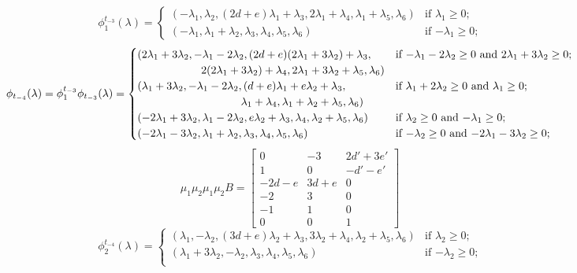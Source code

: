 \documentclass{amsart}
\numberwithin{theorem}{section}
\begin{document}
  \[
    \phi^{t_{-3}}_1(\lambda)
    =
    \begin{cases} 
      (-\lambda_1,\lambda_2,(2d+e)\lambda_1+\lambda_3,2\lambda_1+\lambda_4,\lambda_1+\lambda_5,\lambda_6) & \text{if $\lambda_1 \ge 0$;}\\
      (-\lambda_1,\lambda_1+\lambda_2,\lambda_3,\lambda_4,\lambda_5,\lambda_6) & \text{if $-\lambda_1 \ge 0$;}
    \end{cases}
  \]
  \[
    \phi_{t_{-4}}(\lambda)=\phi^{t_{-3}}_1\phi_{t_{-3}}(\lambda)
    =
    \begin{cases}
      (2\lambda_1+3\lambda_2,-\lambda_1-2\lambda_2,(2d+e)(2\lambda_1+3\lambda_2)+\lambda_3, & \text{if $-\lambda_1-2\lambda_2 \ge 0$ and $2\lambda_1+3\lambda_2 \ge 0$;}\\
      \hspace{0.8in} 2(2\lambda_1+3\lambda_2)+\lambda_4,2\lambda_1+3\lambda_2+\lambda_5,\lambda_6) & \\
      (\lambda_1+3\lambda_2,-\lambda_1-2\lambda_2,(d+e)\lambda_1+e\lambda_2+\lambda_3, & \text{if $\lambda_1+2\lambda_2 \ge 0$ and $\lambda_1 \ge 0$;}\\
      \hspace{1.3in} \lambda_1+\lambda_4,\lambda_1+\lambda_2+\lambda_5,\lambda_6) & \\
      (-2\lambda_1+3\lambda_2,\lambda_1-2\lambda_2,e\lambda_2+\lambda_3,\lambda_4,\lambda_2+\lambda_5,\lambda_6) & \text{if $\lambda_2 \ge 0$ and $-\lambda_1 \ge 0$;}\\
      (-2\lambda_1-3\lambda_2,\lambda_1+\lambda_2,\lambda_3,\lambda_4,\lambda_5,\lambda_6) & \text{if $-\lambda_2 \ge 0$ and $-2\lambda_1-3\lambda_2 \ge 0$;}\\
    \end{cases}
  \]
  \[
    \mu_1\mu_2\mu_1\mu_2 B=\left[\begin{array}{ccc} 
    0 & -3 & 2d'+3e' \\ 
    1 & 0 & -d'-e'\\ 
    -2d-e & 3d+e & 0\\ 
    -2 & 3 & 0\\ 
    -1 & 1 & 0\\ 
    0 & 0 & 1
    \end{array}\right]
  \]
  \[
    \phi^{t_{-4}}_2(\lambda)
    =
    \begin{cases} 
      (\lambda_1,-\lambda_2,(3d+e)\lambda_2+\lambda_3,3\lambda_2+\lambda_4,\lambda_2+\lambda_5,\lambda_6) & \text{if $\lambda_2 \ge 0$;}\\
      (\lambda_1+3\lambda_2,-\lambda_2,\lambda_3,\lambda_4,\lambda_5,\lambda_6) & \text{if $-\lambda_2 \ge 0$;}\\
    \end{cases}
  \]
\end{document}
